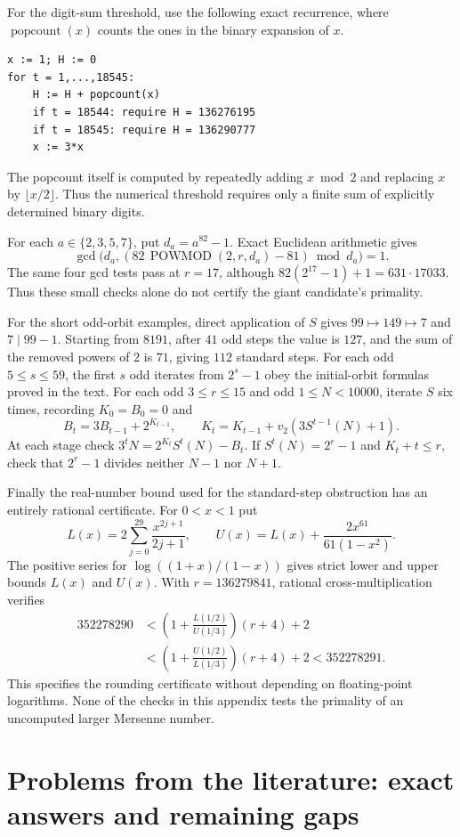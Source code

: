 \documentclass[11pt,a4paper]{article}
\theoremstyle{definition}
\theoremstyle{remark}
\numberwithin{equation}{section}
\begin{document}
For the digit-sum threshold, use the following exact recurrence, where
$\operatorname{popcount}(x)$ counts the ones in the binary expansion of $x$.
\begin{verbatim}
x := 1; H := 0
for t = 1,...,18545:
    H := H + popcount(x)
    if t = 18544: require H = 136276195
    if t = 18545: require H = 136290777
    x := 3*x
\end{verbatim}
The popcount itself is computed by repeatedly adding $x\bmod2$ and
replacing $x$ by $\lfloor x/2\rfloor$. Thus the numerical threshold
requires only a finite sum of explicitly determined binary digits.

For each $a\in\{2,3,5,7\}$, put $d_a=a^{82}-1$. Exact Euclidean
arithmetic gives
\[
 \gcd\bigl(d_a,(82\,\operatorname{POWMOD}(2,r,d_a)-81)
                         \bmod d_a\bigr)=1.
\]
The same four gcd tests pass at $r=17$, although
$82(2^{17}-1)+1=631\cdot17033$. Thus these small checks alone do not
certify the giant candidate's primality.

For the short odd-orbit examples, direct application of $S$ gives
$99\mapsto149\mapsto7$ and $7\mid99-1$.
Starting from $8191$, after $41$ odd steps the value is $127$, and the
sum of the removed powers of $2$ is $71$, giving $112$ standard steps.
For each odd $5\le s\le59$, the first $s$ odd iterates from $2^s-1$
obey the initial-orbit formulas proved in the text.
For each odd $3\le r\le15$ and odd $1\le N<10000$, iterate $S$ six
times, recording $K_0=B_0=0$ and
\[
 B_t=3B_{t-1}+2^{K_{t-1}},\qquad
 K_t=K_{t-1}+v_2(3S^{t-1}(N)+1).
\]
At each stage check
$3^tN=2^{K_t}S^t(N)-B_t$. If $S^t(N)=2^r-1$ and $K_t+t\le r$,
check that $2^r-1$ divides neither $N-1$ nor $N+1$.

Finally the real-number bound used for the standard-step obstruction has
an entirely rational certificate. For $0<x<1$ put
\[
 L(x)=2\sum_{j=0}^{29}\frac{x^{2j+1}}{2j+1},\qquad
 U(x)=L(x)+\frac{2x^{61}}{61(1-x^2)}.
\]
The positive series for $\log((1+x)/(1-x))$ gives strict lower and upper
bounds $L(x)$ and $U(x)$. With $r=136279841$, rational
cross-multiplication verifies
\[
\begin{split}
352278290
&<\left(1+\frac{L(1/2)}{U(1/3)}\right)(r+4)+2\\
&<\left(1+\frac{U(1/2)}{L(1/3)}\right)(r+4)+2
<352278291.
\end{split}
\]
This specifies the rounding certificate without depending on floating-point
logarithms. None of the checks in this appendix tests the primality of an
uncomputed larger Mersenne number.
\clearpage
\part{Problems from the literature: exact answers and remaining gaps}\label{part:B}
\setcounter{section}{0}
\renewcommand{\thesection}{II.\arabic{section}}
\end{document}
